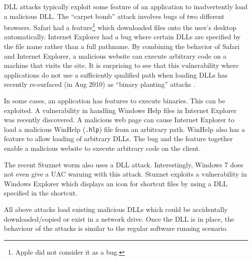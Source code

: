 DLL attacks typically exploit some feature of an application
to inadvertently load a malicious DLL.
The ``carpet bomb'' \cite{safari-carpet-bomb} attack involves bugs of two different
browsers.
Safari had a feature\footnote{
Apple did not consider it as a bug.
}
which downloaded files onto the user's desktop automatically.
Internet Explorer had a bug where certain DLLs are specified
by the file name rather than a full pathname.
By combining the behavior of Safari and Internet Explorer,
a malicious website can execute arbitrary code on a machine 
that visits the site.
It is surprising to see that this vulnerability where applications
do not use a sufficiently qualified path when loading DLLs
has recently re-surfaced
(in Aug 2010) as ``binary planting'' attacks \cite{binary-planting}.

In some cases, an application has features to execute binaries.
This can be exploited.
A vulnerability \cite{winhelp-attack} in handling Windows Help files in
Internet Explorer was recently discovered.
A malicious web page can cause Internet Explorer to load a malicious
WinHelp ({\tt .hlp}) file from an arbitrary path.
WinHelp also has a feature to allow loading of arbitrary DLLs.
The bug and the feature together enable a malicious website to execute
arbitrary code on the client.

The recent Stuxnet worm \cite{matrosov2010stuxnet} also uses a DLL attack.
Interestingly, Windows 7 does not even give a UAC warning with this attack.
Stuxnet exploits a vulnerability in Windows Explorer which displays an icon
for shortcut files by using a DLL specified in the shortcut.

All above attacks load existing malicious DLLs which could be accidentally
downloaded/copied or exist in a network drive.
Once the DLL is in place, the behaviour of the attacks is similar to the
regular software running scenario.
